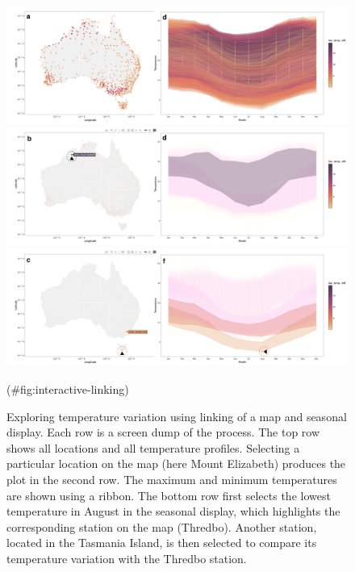 \documentclass[
]{jss}
\begin{document}
\begin{CodeChunk}
\begin{figure}

{\centering \includegraphics[width=1\linewidth,height=0.23\textheight]{figures/linking} \includegraphics[width=1\linewidth,height=0.23\textheight]{figures/linking-north} \includegraphics[width=1\linewidth,height=0.23\textheight]{figures/linking-lower} 

}

\caption[Exploring temperature variation using linking of a map and seasonal display]{Exploring temperature variation using linking of a map and seasonal display. Each row is a screen dump of the process. The top row shows all locations and all temperature profiles. Selecting a particular location on the map (here Mount Elizabeth) produces the plot in the second row. The maximum and minimum temperatures are shown using a ribbon. The bottom row first selects the lowest temperature in August in the seasonal display, which highlights the corresponding station on the map (Thredbo). Another  station, located in the Tasmania Island, is then selected to compare its temperature variation with the Thredbo station.}(\#fig:interactive-linking)
\end{figure}
\end{CodeChunk}
\end{document}
